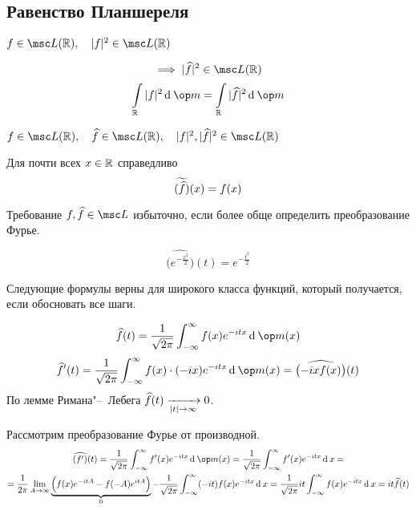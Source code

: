 \subsection{Равенство Планшереля}

\begin{theorem}
	$ f \in \msc L(\R), \quad |f|^2 \in \msc L(\R) $

	$$ \implies |\hat f|^2 \in \msc L(\R) $$
	$$ \int\limits_\R |f|^2 \di \op m = \int\limits_\R |\hat f|^2 \di \op m $$
\end{theorem}

\begin{statement}
	$ f \in \msc L(\R), \quad \hat f \in \msc L(\R), \quad |f|^2, |\hat f|^2 \in \msc L(\R) $

	Для почти всех $ x \in \mathbb{R} $ справедливо
	$$ \widetilde{(\widehat f)}(x) = f(x) $$
\end{statement}

\begin{note}
	Требование $ f, \hat f \in \msc L $ избыточно, если более обще определить преобразование Фурье.
\end{note}

$$ \hat{ \bigl( e^{-\frac{x^2}2} \bigr)}(t) = e^{-\frac{t^2}2} $$

Следующие формулы верны для широкого класса функций, который получается, если обосновать все шаги.

$$ \hat f(t) = \frac1{\sqrt{2\pi}} \int_{-\infty}^\infty f(x) e^{-itx}\di \op m(x) $$
$$ \hat f'(t) = \frac1{\sqrt{2\pi}} \int_{-\infty}^\infty f(x) \cdot (-ix) e^{-itx} \di \op m(x) = \hat{ \bigl( -ixf(x) \bigr)}(t) $$
По лемме Римана"--~Лебега $ \widehat{f}(t) \xrightarrow[|t| \to \infty]{} 0 $.

Рассмотрим преобразование Фурье от производной.
\begin{multline*}
	\hat{(f')}(t) = \frac1{\sqrt{2\pi}} \int_{-\infty}^\infty f'(x) e^{-itx} \di \op m(x) =
	\frac1{\sqrt{2\pi}} \int_{-\infty}^\infty f'(x) e^{-itx}\di x = \\
	= \frac1{2\pi} \lim\limits_{A \to \infty} \underbrace{\Bigl( f(x) e^{-itA} -f(-A) e^{itA} \Bigr)}_0 - \frac1{\sqrt{2\pi}} \int_{-\infty}^\infty (-it) f(x) e^{-itx} \di x =
	\frac1{\sqrt{2\pi}} it \int_{-\infty}^\infty f(x) e^{-itx} \di x = it \hat f(t)
\end{multline*}
